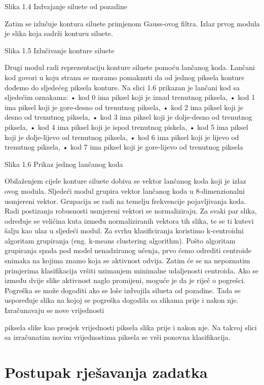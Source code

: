 \documentclass[times, utf8, diplomski]{fer}
\begin{document}
Slika 1.4 Izdvajanje siluete od pozadine


Zatim se izlučuje kontura siluete primjenom Gauss-ovog filtra. Izlaz prvog modula je slika
koja sadrži konturu siluete.

Slika 1.5 Izlučivanje konture siluete


Drugi modul radi reprezentaciju konture siluete pomoću lančanog koda. Lančani kod govori
u koju stranu se moramo pomaknuti da od jednog piksela konture dođemo do sljedećeg
piksela konture. Na slici 1.6 prikazan je lančani kod sa sljedećim oznakama:
• kod 0 ima piksel koji je iznad trenutnog piksela,
• kod 1 ima piksel koji je gore-desno od trenutnog piksela,
• kod 2 ima piksel koji je desno od trenutnog piksela,
• kod 3 ima piksel koji je dolje-desno od trenutnog piksela,
• kod 4 ima piksel koji je ispod trenutnog piskela,
• kod 5 ima piksel koji je dolje-lijevo od trenutnog piksela,
• kod 6 ima piksel koji je lijevo od trenutnog piksela,
• kod 7 ima piksel koji je gore-lijevo od trenutnog piksela


Slika 1.6 Prikaz jednog lančanog koda


Obilaženjem cijele konture siluete dobiva se vektor lančanog koda koji je izlaz ovog modula.
Sljedeći modul grupira vektor lančanog koda u 8-dimenzionalni usmjereni vektor. Grupacija
se radi na temelju frekvencije pojavljivanja koda. Radi postizanja robusnosti usmjereni
vektori se normaliziraju. Za svaki par slika, određuje se veličina kuta između normaliziranih
vektora tih slika, te se ti kutevi šalju kao ulaz u sljedeći modul.
Za svrhu klasificiranja koristimo k-centroidni algoritam grupiranja (eng. k-means clustering
algorithm). Pošto algoritam grupiranja spada pod model nenadziranog učenja, prvo ćemo
odrediti centroide snimaka na kojima znamo koja se aktivnost odvija. Zatim će se na
nepoznatim primjerima klasifikacija vršiti uzimanjem minimalne udaljenosti centroida.
Ako se između dvije slike aktivnost naglo promijeni, moguće je da je riječ o pogrešci.
Pogreška se može dogoditi ako se loše izdvojila silueta od pozadine. Tada se uspoređuje slika
na kojoj se pogreška dogodila sa slikama prije i nakon nje. Izračunavaju se nove vrijednosti

piksela slike kao prosjek vrijednosti piksela slika prije i nakon nje. Na takvoj slici sa
izračunatim novim vrijednostima piksela se vrši ponovna klasifikacija.



\chapter{Postupak rješavanja zadatka}
\end{document}
